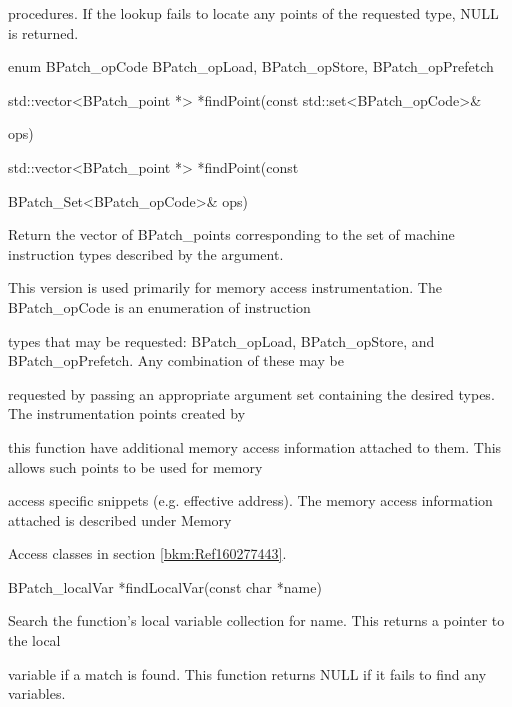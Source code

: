 {{{{{{procedures. If the lookup fails to locate any points of the requested type, NULL is returned.}



{

enum BPatch_opCode { BPatch_opLoad, BPatch_opStore, BPatch_opPrefetch }}



{

std::vector<BPatch_point *> *findPoint(const std::set<BPatch_opCode>&

ops)}



{

std::vector<BPatch_point *> *findPoint(const

BPatch_Set<BPatch_opCode>& ops)}



{

Return the vector of BPatch_points corresponding to the set of machine instruction types described by the argument.

This version is used primarily for memory access instrumentation. The BPatch_opCode is an enumeration of instruction

types that may be requested: BPatch_opLoad, BPatch_opStore, and BPatch_opPrefetch. Any combination of these may be

requested by passing an appropriate argument set containing the desired types. The instrumentation points created by

this function have additional memory access information attached to them. This allows such points to be used for memory

access specific snippets (e.g. effective address). The memory access information attached is described under Memory

Access classes in section \ref{bkm:Ref160277443}.



{

BPatch_localVar *findLocalVar(const char *name)}



{

Search the function's local variable collection for name. This returns a pointer to the local

variable if a match is found. This function returns NULL if it fails to find any variables.}



}}}}}}
